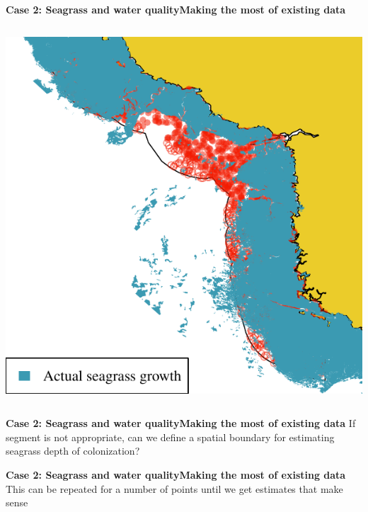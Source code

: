 \documentclass[serif]{beamer}\usepackage[]{graphicx}\usepackage[]{color}
\makeatletter
\def\maxwidth{ %
  \ifdim\Gin@nat@width>\linewidth
    \linewidth
  \else
    \Gin@nat@width
  \fi
}
\newenvironment{knitrout}{}{} %
\makeatother
\begin{document}
\begin{frame}{\textbf{Case 2: Seagrass and water quality}}{\textbf{Making the most of existing data}}
\begin{columns}[T]
\begin{column}{0.45\textwidth}
\begin{knitrout}
{\centering \includegraphics[width=\maxwidth]{fig//docfail2} 

}



\end{knitrout}
\end{column}
\end{columns}
\end{frame}


\begin{frame}{\textbf{Case 2: Seagrass and water quality}}{\textbf{Making the most of existing data}}
If segment is not appropriate, can we define a spatial boundary for estimating seagrass depth of colonization?
\begin{center}
\end{center}
\end{frame}


\begin{frame}{\textbf{Case 2: Seagrass and water quality}}{\textbf{Making the most of existing data}}
This can be repeated for a number of points until we get estimates that make sense
\begin{center}
\end{center}
\end{frame}
\end{document}
